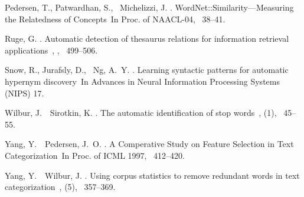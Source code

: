 \documentclass[english]{jnlp_1.4}
\begin{document}
\begin{thebibliography}{}
Pedersen, T., Patwardhan, S., \BBA\ Michelizzi, J. \BBCP.
\newblock \BBOQ WordNet::Similarity---Measuring the Relatedness of
  Concepts\BBCQ\
\newblock In {\Bem Proc. of NAACL-04}, \mbox{\BPGS\ 38--41}.

Ruge, G. \BBCP.
\newblock \BBOQ Automatic detection of thesaurus relations for information
  retrieval applications\BBCQ\
, {}, \mbox{\BPGS\ 499--506}.

Snow, R., Jurafsly, D., \BBA\ Ng, A.~Y. \BBCP.
\newblock \BBOQ Learning syntactic patterns for automatic hypernym
  discovery\BBCQ\
\newblock In {\Bem Advances in Neural Information Processing Systems (NIPS)
  17}.

Wilbur, J.\BBACOMMA\ \BBA\ Sirotkin, K. \BBCP.
\newblock \BBOQ The automatic identification of stop words\BBCQ\
, {}  (1), \mbox{\BPGS\
  45--55}.

Yang, Y.\BBACOMMA\ \BBA\ Pedersen, J.~O. \BBOP 1997\BBCP.
\newblock \BBOQ A Comperative Study on Feature Selection in Text
  Categorization\BBCQ\
\newblock In {\Bem Proc. of ICML 1997}, \mbox{\BPGS\ 412--420}.

Yang, Y.\BBACOMMA\ \BBA\ Wilbur, J. \BBOP 1996\BBCP.
\newblock \BBOQ Using corpus statistics to remove redundant words in text
  categorization\BBCQ\
, {\Bbf
  47}  (5), \mbox{\BPGS\ 357--369}.

\end{thebibliography}

\clearpage
\end{document}
